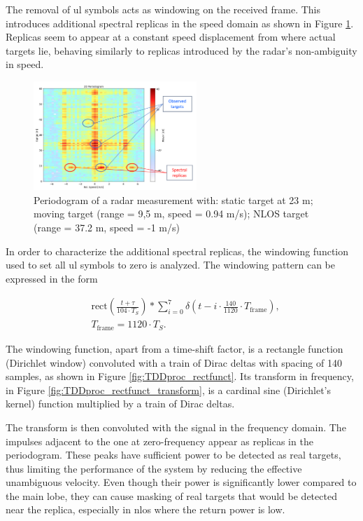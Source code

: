     The removal of \gls{ul} symbols acts as windowing on the received frame. This introduces additional spectral replicas in the speed domain as shown in Figure \ref{fig:SpectralReplicasDLULpattern}. Replicas seem to appear at a constant speed displacement from where actual targets lie, behaving similarly to replicas introduced by the radar's non-ambiguity in speed.
    
    \begin{figure}[H]
        \centering
        \includegraphics[width=0.55\textwidth]{Images/TDDprocessing/SpectralReplicasDLULpattern.png}
        \caption{Periodogram of a radar measurement with: static target at 23 m; moving target (range = 9,5 m, speed = 0.94 m/s); NLOS target (range = 37.2 m, speed = -1 m/s)}
        \label{fig:SpectralReplicasDLULpattern}
    \end{figure}
    
    In order to characterize the additional spectral replicas, the windowing function used to set all \gls{ul} symbols to zero is analyzed. The windowing pattern can be expressed in the form
    
    \begin{align}
        &\text{rect}\left( \frac{t + \tau}{104 \cdot T_S}\right) \ast \sum_{i=0}^7 \delta\left( t - i\cdot \frac{140}{1120}\cdot T_{\text{frame}} \right),  \\
        &T_{\text{frame}} = 1120 \cdot T_S.
    \end{align}

    The windowing function, apart from a time-shift factor, is a rectangle function (Dirichlet window) convoluted with a train of Dirac deltas with spacing of 140 samples, as shown in Figure \ref{fig:TDDproc_rectfunct}. Its transform in frequency, in Figure \ref{fig:TDDproc_rectfunct_transform}, is a cardinal sine (Dirichlet's kernel) function multiplied by a train of Dirac deltas.

    The transform is then convoluted with the signal in the frequency domain. The impulses adjacent to the one at zero-frequency appear as replicas in the periodogram. These peaks have sufficient power to be detected as real targets, thus limiting the performance of the system by reducing the effective unambiguous velocity. Even though their power is significantly lower compared to the main lobe, they can cause masking of real targets that would be detected near the replica, especially in \gls{nlos} where the return power is low. 


